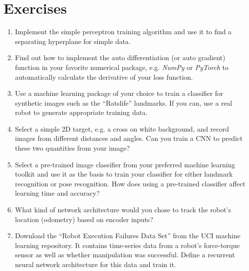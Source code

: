 \section*{Exercises}\small
\begin{enumerate}
\item Implement the simple perceptron training algorithm and use it to find a separating hyperplane for simple data.
\item Find out how to implement the auto differentiation (or auto gradient) function in your favorite numerical package, e.g. \textsl{NumPy} or \textsl{PyTorch} to automatically calculate the derivative of your loss function.
\item Use a machine learning package of your choice to train a classifier for synthetic images such as the ``Ratslife'' landmarks. If you can, use a real robot to generate appropriate training data.
\item Select a simple 2D target, e.g. a cross on white background, and record images from different distances and angles. Can you train a CNN to predict these two quantities from your image?
\item Select a pre-trained image classifier from your preferred machine learning toolkit and use it as the basis to train your classifier for either landmark recognition or pose recognition. How does using a pre-trained classifier affect learning time and accuracy?
\item What kind of network architecture would you chose to track the robot's location (odometry) based on encoder inputs?
\item Download the ``Robot Execution Failures Data Set'' from the UCI machine learning repository. It contains time-series data from a robot's force-torque sensor as well as whether manipulation was successful. Define a recurrent neural network architecture for this data and train it.
\end{enumerate}\normalsize


